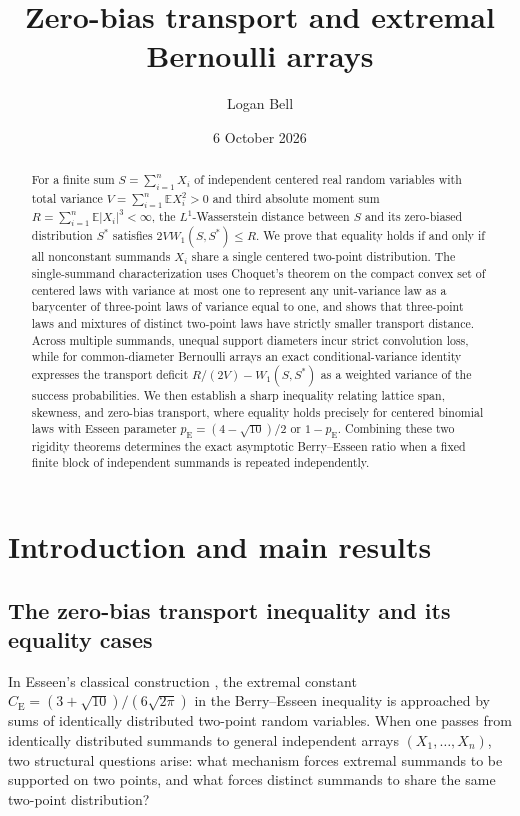 \documentclass[11pt]{article}
\title{Zero-bias transport and extremal Bernoulli arrays}
\author{Logan Bell}
\date{6 October 2026}
\numberwithin{equation}{section}
\theoremstyle{remark}
\newcommand{\E}{\mathbb E}
\newcommand{\ce}{C_{\mathrm E}}
\begin{document}
\maketitle
\begin{abstract}
For a finite sum $S=\sum_{i=1}^nX_i$ of independent centered real random
variables with total variance $V=\sum_{i=1}^n\E X_i^2>0$ and third absolute
moment sum $R=\sum_{i=1}^n\E|X_i|^3<\infty$, the $L^1$-Wasserstein distance
between $S$ and its zero-biased distribution $S^*$ satisfies
$2VW_1(S,S^*)\le R$. We prove that equality holds if and only if all
nonconstant summands $X_i$ share a single centered two-point distribution.
The single-summand characterization uses Choquet's theorem on the compact
convex set of centered laws with variance at most one to represent any unit-variance
law as a barycenter of three-point laws of variance equal to one, and shows
that three-point laws and mixtures of distinct two-point laws have strictly
smaller transport distance. Across multiple summands, unequal support
diameters incur strict convolution loss, while for common-diameter Bernoulli
arrays an exact conditional-variance identity expresses the transport deficit
$R/(2V)-W_1(S,S^*)$ as a weighted variance of the success probabilities.
We then establish a sharp inequality relating lattice span, skewness, and
zero-bias transport, where equality holds precisely for centered binomial
laws with Esseen parameter $p_{\mathrm E}=(4-\sqrt{10})/2$ or $1-p_{\mathrm E}$.
Combining these two rigidity theorems determines the exact asymptotic
Berry--Esseen ratio when a fixed finite block of independent summands is
repeated independently.
\end{abstract}

\setcounter{tocdepth}{2}
\tableofcontents

\section{Introduction and main results}\label{sec:results}

\subsection{The zero-bias transport inequality and its equality cases}

In Esseen's classical construction \citep{Esseen1956}, the extremal constant
$\ce=(3+\sqrt{10})/(6\sqrt{2\pi})$ in the Berry--Esseen inequality is
approached by sums of identically distributed two-point random variables.
When one passes from identically distributed summands to general independent
arrays $(X_1,\ldots,X_n)$, two structural questions arise: what mechanism
forces extremal summands to be supported on two points, and what forces
distinct summands to share the same two-point distribution?
\end{document}
